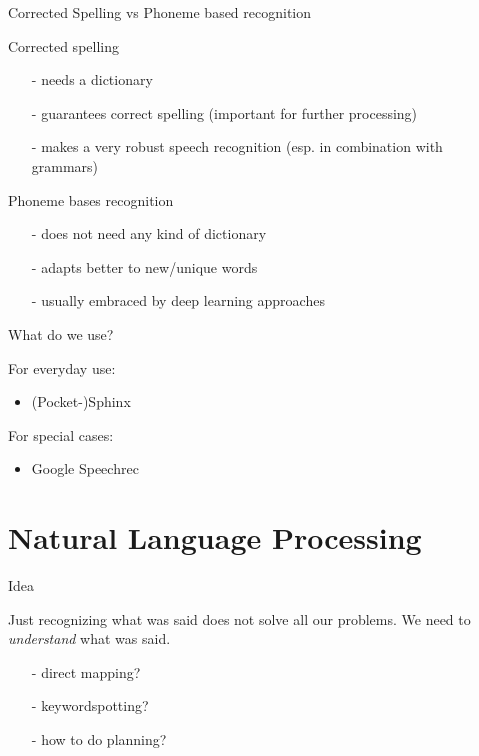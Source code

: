 \documentclass{beamer}
\begin{document}
	\begin{frame}{Corrected Spelling vs Phoneme based recognition}
		\begin{alertblock}{Corrected spelling}
			\begin{itemize}
				\item[-] needs a dictionary
				\item[-] guarantees correct spelling (important for further processing)
				\item[-] makes a very robust speech recognition (esp. in combination with grammars)
			\end{itemize}
		\end{alertblock}
		\begin{alertblock}{Phoneme bases recognition}
			\begin{itemize}
				\item[-] does not need any kind of dictionary
				\item[-] adapts better to new/unique words
				\item[-] usually embraced by deep learning approaches
			\end{itemize}
		\end{alertblock}
	\end{frame}
	
	\begin{frame}{What do we use?}
		\begin{alertblock}{For everyday use:}
			\pause
			\begin{itemize}
				\item (Pocket-)Sphinx
			\end{itemize}
		\end{alertblock}
		
		\begin{alertblock}{For special cases:}
			\pause
			\begin{itemize}
				\item Google Speechrec
			\end{itemize}
		\end{alertblock}
	\end{frame}
	
	\section{Natural Language Processing}%
	
	\begin{frame}{Idea}
		\begin{alertblock}{Just recognizing what was said does not solve all our problems. We need to \emph{understand} what was said.}
			\pause
			\begin{itemize}
				\item[-] direct mapping?
				\pause
				\item[-] keywordspotting?
				\pause
				\item[-] how to do planning?
			\end{itemize}
		\end{alertblock}
	\end{frame}
	
\end{document}
